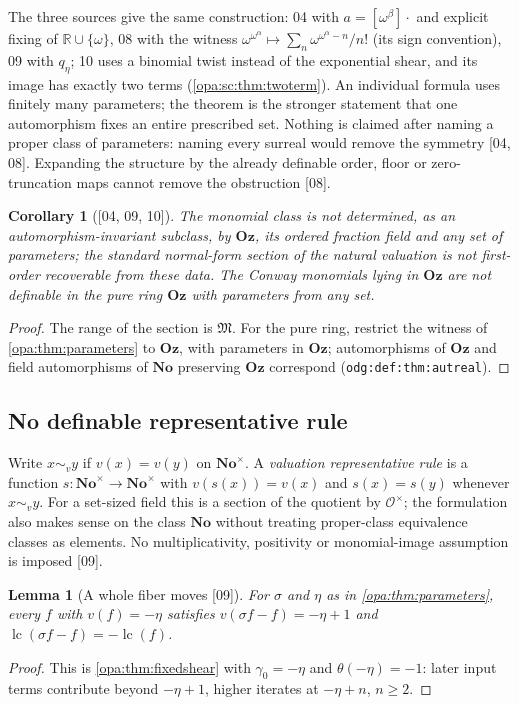 \documentclass[11pt,oneside]{article}
\numberwithin{equation}{section}
\newtheorem{lemma}[lemma]{Lemma}
\newtheorem{corollary}[corollary]{Corollary}
\theoremstyle{definition}
\theoremstyle{remark}
\newcommand{\No}{\mathbf{No}}
\newcommand{\Oz}{\mathbf{Oz}}
\newcommand{\R}{\mathbb R}
\newcommand{\OO}{\mathcal O}
\newcommand{\Mon}{\mathfrak M}
\newcommand{\lc}{\operatorname{lc}}
\newcommand{\src}[1]{\textup{\textsf{\small[#1]}}}
\newcommand{\lbl}[1]{\nolinkurl{#1}}
\begin{document}
The three sources give the same construction: 04 with $a=[\omega^\beta]\cdot$ and
explicit fixing of $\R\cup\{\omega\}$, 08 with the witness
$\omega^{\omega^\alpha}\mapsto\sum_n\omega^{\omega^\alpha-n}/n!$ (its sign convention), 09
with $q_\eta$; 10 uses a binomial twist instead of the exponential shear, and
its image has exactly two terms (\cref{opa:sc:thm:twoterm}). An individual formula uses finitely many parameters; the theorem is
the stronger statement that one automorphism fixes an entire prescribed set.
Nothing is claimed after naming a proper class of parameters: naming every
surreal would remove the symmetry \src{04, 08}. Expanding the structure by the
already definable order, floor or zero-truncation maps cannot remove the
obstruction \src{08}.

\begin{corollary}[\src{04, 09, 10}]\label{opa:cor:puring}
The monomial class is not determined, as an automorphism-invariant subclass, by
$\Oz$, its ordered fraction field and any set of parameters; the standard
normal-form section of the natural valuation is not first-order recoverable
from these data. The Conway monomials lying in $\Oz$ are not definable in the
pure ring $\Oz$ with parameters from any set.
\end{corollary}
\begin{proof}
The range of the section is $\Mon$. For the pure ring, restrict the witness of
\cref{opa:thm:parameters} to $\Oz$, with parameters in $\Oz$; automorphisms of $\Oz$
and field automorphisms of $\No$ preserving $\Oz$ correspond
(\lbl{odg:def:thm:autreal}).
\end{proof}

\subsection{No definable representative rule}

Write $x\sim_vy$ if $v(x)=v(y)$ on $\No^\times$. A \emph{valuation representative
rule} is a function $s:\No^\times\to\No^\times$ with $v(s(x))=v(x)$ and
$s(x)=s(y)$ whenever $x\sim_vy$. For a set-sized field this is a section of the
quotient by $\OO^\times$; the formulation also makes sense on the class $\No$
without treating proper-class equivalence classes as elements. No
multiplicativity, positivity or monomial-image assumption is imposed \src{09}.

\begin{lemma}[A whole fiber moves \src{09}]\label{opa:lem:fiber}
For $\sigma$ and $\eta$ as in \cref{opa:thm:parameters}, every $f$ with $v(f)=-\eta$
satisfies $v(\sigma f-f)=-\eta+1$ and $\lc(\sigma f-f)=-\lc(f)$.
\end{lemma}
\begin{proof}
This is \cref{opa:thm:fixedshear} with $\gamma_0=-\eta$ and $\theta(-\eta)=-1$: later
input terms contribute beyond $-\eta+1$, higher iterates at $-\eta+n$, $n\ge2$.
\end{proof}
\end{document}
